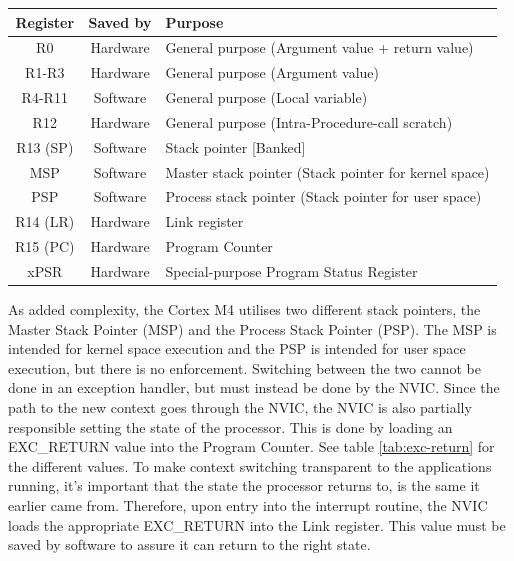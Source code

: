 \begin{table}[H]
	\centering
	\begin{tabular}{|c|c|p{9.5cm}|}
		\hline
		Register	&	Saved by	&	Purpose\\
		\hline
		R0			&	Hardware	&	General purpose (Argument value + return value)\\
		\hline
		R1-R3		&	Hardware	&	General purpose (Argument value)\\
		\hline
		R4-R11		&	Software	&	General purpose (Local variable)\\
		\hline
		R12			&	Hardware	&	General purpose (Intra-Procedure-call scratch)\\
		\hline
		R13 (SP)	&	Software	&	Stack pointer [Banked]\\
		MSP			&	Software	&	Master stack pointer (Stack pointer for kernel space)\\
		PSP			&	Software	&	Process stack pointer (Stack pointer for user space)\\
		\hline
		R14 (LR)	&	Hardware	&	Link register\\
		\hline
		R15 (PC)	&	Hardware	&	Program Counter\\
		\hline
		xPSR		&	Hardware	& 	Special-purpose Program Status Register\\
		\hline
	\end{tabular}
	\label{tab:registers}
\end{table}

As added complexity, the Cortex M4 utilises two different stack pointers, the Master Stack Pointer (MSP) and the Process Stack Pointer (PSP).
The MSP is intended for kernel space execution and the PSP is intended for user space execution, but there is no enforcement.
Switching between the two cannot be done in an exception handler, but must instead be done by the NVIC.
Since the path to the new context goes through the NVIC, the NVIC is also partially responsible setting the state of the processor.
This is done by loading an EXC\_RETURN value into the Program Counter. See table \ref{tab:exc-return} for the different values.
To make context switching transparent to the applications running, it's important that the state the processor returns to, is the
same it earlier came from. Therefore, upon entry into the interrupt routine, the NVIC loads the appropriate EXC\_RETURN into the Link
register. This value must be saved by software to assure it can return to the right state.


